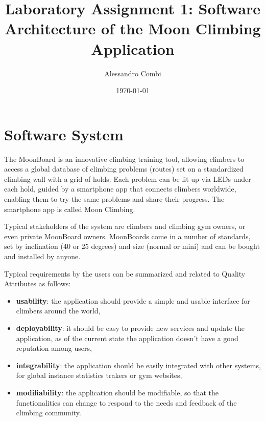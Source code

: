 \documentclass{article}
\title{Laboratory Assignment 1: Software Architecture of the Moon Climbing Application}
\author{Alessandro Combi}
\date{\today}
\begin{document}
\maketitle
\newpage

\tableofcontents
\newpage

\section{Software System}%

The MoonBoard is an innovative climbing training tool, allowing climbers to access a global database of climbing problems (routes) set on a standardized climbing wall with a grid of holds. 
Each problem can be lit up via LEDs under each hold, guided by a smartphone app that connects climbers worldwide, enabling them to try the same problems and share their progress. 
The smartphone app is called Moon Climbing.

Typical stakeholders of the system are climbers and climbing gym owners, or even private MoonBoard owners. 
MoonBoards come in a number of standards, set by inclination (40 or 25 degrees) and size (normal or mini) and can be bought and installed by anyone.

Typical requirements by the users can be summarized and related to Quality Attributes as follows:
\begin{itemize}
    \item \textbf{usability}: the application should provide a simple and usable interface for climbers around the world,
    \item \textbf{deployability}: it should be easy to provide new services and update the application, as of the current state the application doesn't have a good reputation among users,
    \item \textbf{integrability}: the application should be easily integrated with other systems, for global instance statistics trakers or gym websites,
    \item \textbf{modifiability}: the application should be modifiable, so that the functionalities can change to respond to the needs and feedback of the climbing community.
\end{itemize}    
\end{document}
